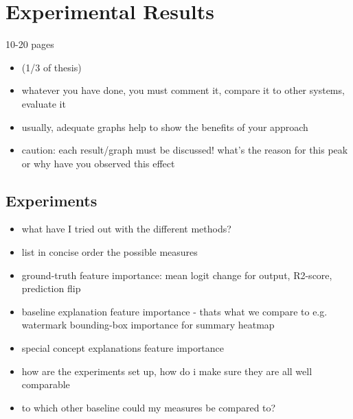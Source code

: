 \chapter{Experimental Results}\label{chapter:results}

{ \color{red}
10-20 pages 

    \begin{itemize}
        \item (1/3 of thesis)
        \item whatever you have done, you must comment it, compare it to other systems, evaluate it
        \item usually, adequate graphs help to show the benefits of your approach
        \item caution: each result/graph must be discussed! what's the reason for this peak or why have you observed this effect
    \end{itemize}
}


\section{Experiments}
\begin{itemize}
    \item what have I tried out with the different methods?
    \item list in concise order the possible measures
    \item ground-truth feature importance: mean logit change for output, R2-score,  prediction flip
    \item baseline explanation feature importance - thats what we compare to e.g. watermark bounding-box importance for summary heatmap
    \item special concept explanations feature importance
    \item how are the experiments set up, how do i make sure they are all well comparable
    \item to which other baseline could my measures be compared to?
\end{itemize}

